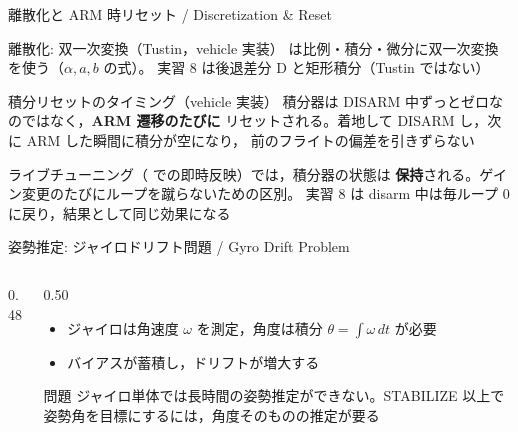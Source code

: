 \begin{frame}{離散化と ARM 時リセット / Discretization \& Reset}
  \begin{block}{離散化: 双一次変換（Tustin，vehicle 実装）}\small
     は比例・積分・微分に双一次変換を使う（$\alpha, a, b$ の式）。
    実習 8 は後退差分 D と矩形積分（Tustin ではない）
  \end{block}

  \vspace{0.3em}

  \begin{exampleblock}{積分リセットのタイミング（vehicle 実装）}\small
    積分器は DISARM 中ずっとゼロなのではなく，\textbf{ARM 遷移のたびに}
    リセットされる。着地して DISARM し，次に ARM した瞬間に積分が空になり，
    前のフライトの偏差を引きずらない
  \end{exampleblock}

  \vspace{0.3em}

  {\footnotesize
  ライブチューニング（ での即時反映）では，積分器の状態は
  \textbf{保持}される。ゲイン変更のたびにループを蹴らないための区別。
  実習 8 は disarm 中は毎ループ 0 に戻り，結果として同じ効果になる}
\end{frame}

\begin{frame}{姿勢推定: ジャイロドリフト問題 / Gyro Drift Problem}
  \begin{columns}[c]
    \begin{column}{0.48\textwidth}
      \centering
      \resizebox{\linewidth}{!}{}
    \end{column}
    \begin{column}{0.50\textwidth}
      \begin{itemize}\small
        \item ジャイロは角速度 $\omega$ を測定，角度は積分 $\theta=\int\omega\,dt$ が必要
        \item バイアスが蓄積し，ドリフトが増大する
      \end{itemize}
      \vspace{0.5em}
      \begin{alertblock}{問題}\small
        ジャイロ単体では長時間の姿勢推定ができない。STABILIZE 以上で
        姿勢角を目標にするには，角度そのものの推定が要る
      \end{alertblock}
    \end{column}
  \end{columns}
\end{frame}

